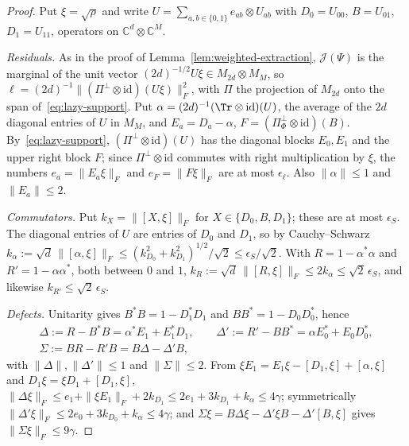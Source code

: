 \begin{proof}
Put $\xi=\sqrt\rho$ and write $U=\sum_{a,b\in\{0,1\}}e_{ab}\otimes U_{ab}$ with $D_0=U_{00}$, $B=U_{01}$, $D_1=U_{11}$, operators on $\mathbb C^d\otimes\mathbb C^M$.

\emph{Residuals.} As in the proof of Lemma~\ref{lem:weighted-extraction}, $\mathcal J(\Psi)$ is the marginal of the unit vector
$(2d)^{-1/2}U\xi\in M_{2d}\otimes M_M$, so $\ell=(2d)^{-1}\|(\Pi^\perp\otimes\mathrm{id})(U\xi)\|_F^2$, with $\Pi$ the projection of $M_{2d}$ onto the span
of~\eqref{eq:lazy-support}. Put $\alpha=(2d)^{-1}(\Tr\otimes\mathrm{id})(U)$, the average of the $2d$ diagonal entries of $U$ in $M_M$, and
$E_a=D_a-\alpha$, $F=(\Pi_\Phi^\perp\otimes\mathrm{id})(B)$. By~\eqref{eq:lazy-support}, $(\Pi^\perp\otimes\mathrm{id})(U)$ has the diagonal blocks $E_0,E_1$ and
the upper right block $F$; since $\Pi^\perp\otimes\mathrm{id}$ commutes with right multiplication by $\xi$, the numbers $e_a=\|E_a\xi\|_F$ and
$e_F=\|F\xi\|_F$ are at most $\epsilon_\ell$. Also $\|\alpha\|\le1$ and $\|E_a\|\le2$.

\emph{Commutators.} Put $k_X=\|[X,\xi]\|_F$ for $X\in\{D_0,B,D_1\}$; these are at most $\epsilon_S$. The diagonal entries of $U$ are entries of $D_0$ and
$D_1$, so by Cauchy--Schwarz $k_\alpha:=\sqrt d\,\|[\alpha,\xi]\|_F\le(k_{D_0}^2+k_{D_1}^2)^{1/2}/\sqrt2\le\epsilon_S/\sqrt2$. With $R=1-\alpha^*\alpha$ and
$R'=1-\alpha\alpha^*$, both between $0$ and $1$, $k_R:=\sqrt d\,\|[R,\xi]\|_F\le2k_\alpha\le\sqrt2\,\epsilon_S$, and likewise $k_{R'}\le\sqrt2\,\epsilon_S$.

\emph{Defects.} Unitarity gives $B^*B=1-D_1^*D_1$ and $BB^*=1-D_0D_0^*$, hence
\begin{gather*}
\Delta:=R-B^*B=\alpha^*E_1+E_1^*D_1,\qquad\Delta':=R'-BB^*=\alpha E_0^*+E_0D_0^*,\\
\Sigma:=BR-R'B=B\Delta-\Delta'B,
\end{gather*}
with $\|\Delta\|,\|\Delta'\|\le1$ and $\|\Sigma\|\le2$. From $\xi E_1=E_1\xi-[D_1,\xi]+[\alpha,\xi]$ and $D_1\xi=\xi D_1+[D_1,\xi]$,
$\|\Delta\xi\|_F\le e_1+\|\xi E_1\|_F+2k_{D_1}\le2e_1+3k_{D_1}+k_\alpha\le4\gamma$; symmetrically $\|\Delta'\xi\|_F\le2e_0+3k_{D_0}+k_\alpha\le4\gamma$;
and $\Sigma\xi=B\Delta\xi-\Delta'\xi B-\Delta'[B,\xi]$ gives $\|\Sigma\xi\|_F\le9\gamma$.


\end{proof}
